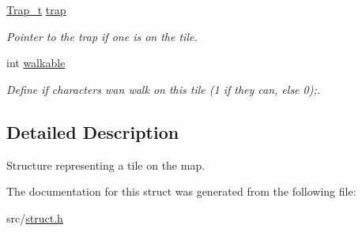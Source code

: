 \begin{DoxyCompactItemize}
\mbox{\label{struct_tile_abad7de3ef7deb8406c00f13bf20cc8a7}} 
\hyperlink{struct_trap__t}{Trap\+\_\+t} \hyperlink{struct_tile_abad7de3ef7deb8406c00f13bf20cc8a7}{trap}
\begin{DoxyCompactList}\small\item\em Pointer to the trap if one is on the tile. \end{DoxyCompactList}\item 
\mbox{\label{struct_tile_acb2f7617ad3ab3635e896dabd9456466}} 
int \hyperlink{struct_tile_acb2f7617ad3ab3635e896dabd9456466}{walkable}
\begin{DoxyCompactList}\small\item\em Define if characters wan walk on this tile (1 if they can, else 0);. \end{DoxyCompactList}\end{DoxyCompactItemize}


\subsection{Detailed Description}
Structure representing a tile on the map. 

The documentation for this struct was generated from the following file\+:\begin{DoxyCompactItemize}
\item 
src/\hyperlink{struct_8h}{struct.\+h}\end{DoxyCompactItemize}
